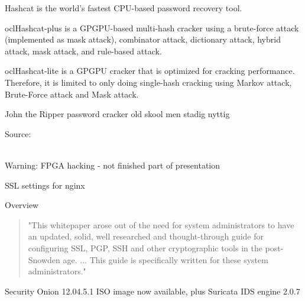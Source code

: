 \documentclass[20pt,landscape,a4paper]{foils}
\begin{document}

\begin{list2}
\item Hashcat is the world's fastest CPU-based password recovery tool.
\item oclHashcat-plus is a GPGPU-based multi-hash cracker using a brute-force attack (implemented as mask attack), combinator attack, dictionary attack, hybrid attack, mask attack, and rule-based attack.
\item oclHashcat-lite is a GPGPU cracker that is optimized for cracking performance. Therefore, it is limited to only doing single-hash cracking using Markov attack, Brute-Force attack and Mask attack.
\item John the Ripper password cracker old skool men stadig nyttig
\end{list2}

Source:\\
\\




Warning: FPGA hacking - not finished part of presentation





SSL settings for nginx

Overview
\begin{quote}
"This whitepaper arose out of the need for system administrators to have an updated,
solid, well researched and thought-through guide for configuring SSL, PGP, SSH and
other cryptographic tools in the post-Snowden age. ... This guide is specifically
written for these system administrators."
\end{quote}





\begin{list1}
\item Security Onion 12.04.5.1 ISO image now available, plus
Suricata IDS engine 2.0.7
\end{list1}
\end{document}
